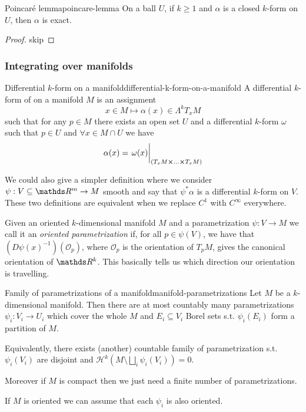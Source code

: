 \documentclass[12pt]{extarticle}
\begin{document}
\begin{theorem}{Poincaré lemma}{poincare-lemma}
	On a ball $U$, if $k \geq 1$ and $\alpha$ is a closed $k$-form on $U$, then $\alpha$ is exact.
\end{theorem}

\begin{proof}
	skip
\end{proof}

\subsubsection{Integrating over manifolds}

\begin{definition}{Differential $k$-form on a manifold}{differential-k-form-on-a-manifold}
	A differential $k$-form of on a manifold $M$ is an assignment
	\begin{equation}
		x \in M \mapsto \alpha(x) \in \Lambda^k T_x M
	\end{equation}
	such that for any $p \in M$ there exists an open set $U$ and a differential $k$-form $\omega$
	such that $p \in U$ and $\forall x \in M \cap U$ we have
	\begin{equation}
		\alpha(x) = \eval{\omega(x)}_{(T_xM \cross \dots \cross T_xM)}
	\end{equation}
\end{definition}
We could also give a simpler definition where we consider $\psi : V \subseteq \R^m \to M$ smooth and
say that $\psi^* \alpha$ is a differential $k$-form on $V$. These two definitions are equivalent
when we replace $C^1$ with $C^\infty$ everywhere.

Given an oriented $k$-dimensional manifold $M$ and a parametrization $\psi : V \to M$ we call it an
\emph{oriented parametrization} if, for all $p \in \psi(V)$, we have that
$(D \psi(x)^{-1})(\mathcal O_p)$, where $\mathcal O_p$ is the orientation of $T_pM$,
gives the canonical orientation of $\R^k$.
This basically tells us which direction our orientation is travelling.

\begin{proposition}{Family of parametrizations of a manifold}{manifold-parametrizations}
	Let $M$ be a $k$-dimensional manifold. Then there are at most countably many parametrizations
	$\psi_i: V_i \to U_i$ which cover the whole $M$ and $E_i \subseteq V_i$ Borel sets s.t.
	$\psi_i(E_i)$ form a partition of $M$.

	Equivalently, there exists (another) countable family of parametrization s.t. $\psi_i(V_i)$ are
	disjoint and $\mathcal H^k(M \setminus \bigsqcup_{i} \psi_i(V_i)) = 0$.

	Moreover if $M$ is compact then we just need a finite number of parametrizations.

	If $M$ is oriented we can assume that each $\psi_i$ is also oriented.
\end{proposition}
\end{document}
